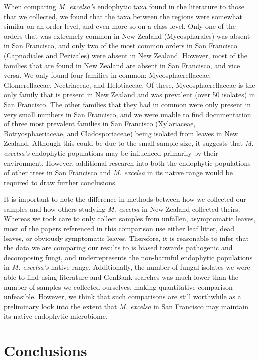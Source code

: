 \documentclass[fleqn,10pt,lineno]{wlpeerj} %
\begin{document}
When comparing \emph{M. excelsa's} endophytic taxa found in the literature to those that we collected, we found that the taxa between the regions were somewhat similar on an order level, and even more so on a class level. Only one of the orders that was extremely common in New Zealand (Mycospharales) was absent in San Francisco, and only two of the most common orders in San Francisco (Capnodiales and Pezizales) were absent in New Zealand. However, most of the families that are found in New Zealand are absent in San Francisco, and vice versa. We only found four families in common: Mycosphaerellaceae, Glomerellaceae, Nectriaceae, and Helotiaceae. Of these, Mycosphaerellaceae is the only family that is present in New Zealand and was prevalent (over 50 isolates) in San Francisco. The other families that they had in common were only present in very small numbers in San Francisco, and we were unable to find documentation of three most prevalent families in San Francisco (Xylariaceae, Botryosphaeriaceae, and Cladosporiaceae) being isolated from leaves in New Zealand. Although this could be due to the small sample size, it suggests that \emph{M. excelsa's} endophytic populations may be influenced primarily by their environment. However, additional research into both the endophytic populations of other trees in San Francisco and \emph{M. excelsa} in its native range would be required to draw further conclusions.

It is important to note the difference in methods between how we collected our samples and how others studying \emph{M. excelsa} in New Zealand collected theirs. Whereas we took care to only collect samples from unfallen, asymptomatic leaves, most of the papers referenced in this comparison use either leaf litter, dead leaves, or obviously symptomatic leaves. Therefore, it is reasonable to infer that the data we are comparing our results to is biased towards pathogenic and decomposing fungi, and underrepresents the non-harmful endophytic populations in \emph{M. excelsa's} native range. Additionally, the number of fungal isolates we were able to find using literature and GenBank searches was much lower than the number of samples we collected ourselves, making quantitative comparison unfeasible. However, we think that such comparisons are still worthwhile as a preliminary look into the extent that \emph{M. excelsa} in San Francisco may maintain its native endophytic microbiome.

\hypertarget{conclusions}{%
\section*{Conclusions}\label{conclusions}}
\end{document}
